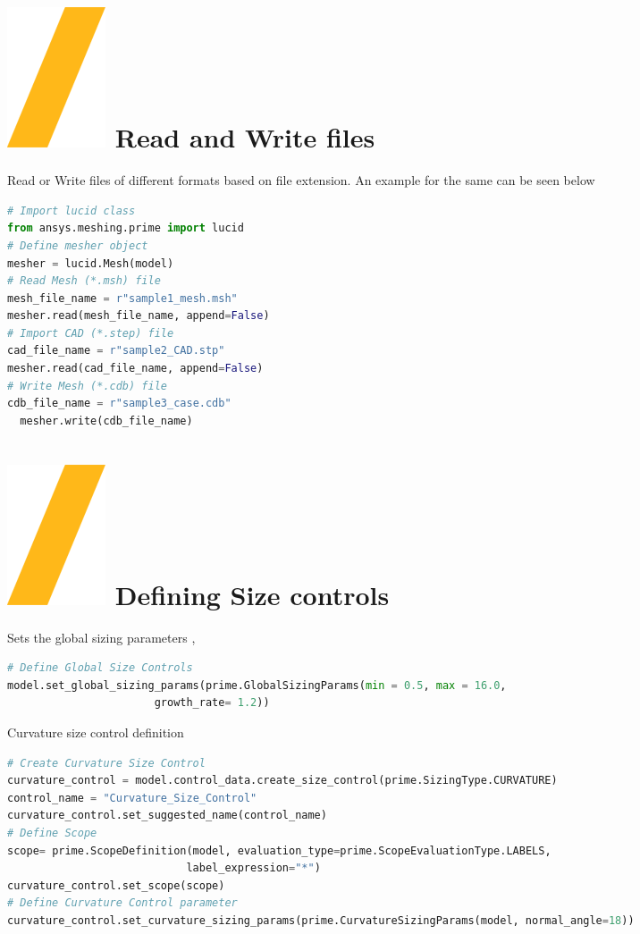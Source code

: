 \documentclass[9pt,landscape]{article}
\begin{document}
\begin{multicols}{3}
\section{\includegraphics[height=\fontcharht\font`\S]{slash.png} Read and Write files }
Read or Write files of different formats based on file extension.
An example for the same can be seen below\\
\begin{lstlisting}[language=Python]
# Import lucid class
from ansys.meshing.prime import lucid
# Define mesher object
mesher = lucid.Mesh(model)
# Read Mesh (*.msh) file
mesh_file_name = r"sample1_mesh.msh"
mesher.read(mesh_file_name, append=False)
# Import CAD (*.step) file
cad_file_name = r"sample2_CAD.stp"
mesher.read(cad_file_name, append=False)
# Write Mesh (*.cdb) file
cdb_file_name = r"sample3_case.cdb"
  mesher.write(cdb_file_name)
\end{lstlisting}

\section{\includegraphics[height=\fontcharht\font`\S]{slash.png} Defining Size controls }
Sets the global sizing parameters , 

\begin{lstlisting}[language=Python]
# Define Global Size Controls
model.set_global_sizing_params(prime.GlobalSizingParams(min = 0.5, max = 16.0,
                       growth_rate= 1.2))
\end{lstlisting}

Curvature size control definition
\begin{lstlisting}[language=Python]
# Create Curvature Size Control
curvature_control = model.control_data.create_size_control(prime.SizingType.CURVATURE)
control_name = "Curvature_Size_Control"
curvature_control.set_suggested_name(control_name)
# Define Scope 
scope= prime.ScopeDefinition(model, evaluation_type=prime.ScopeEvaluationType.LABELS,
                            label_expression="*")
curvature_control.set_scope(scope)
# Define Curvature Control parameter
curvature_control.set_curvature_sizing_params(prime.CurvatureSizingParams(model, normal_angle=18))
\end{lstlisting}

\end{multicols}
\end{document}
